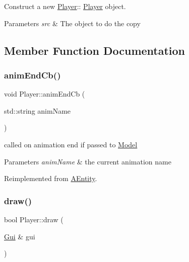Construct a new \hyperlink{class_player}{Player}\+:\+: \hyperlink{class_player}{Player} object. 


\begin{DoxyParams}{Parameters}
{\em src} & The object to do the copy \\
\hline
\end{DoxyParams}


\subsection{Member Function Documentation}
\mbox{\label{class_player_a26c511cf5a62d7de26347cdc15df609b}} 
\subsubsection{\texorpdfstring{anim\+End\+Cb()}{animEndCb()}}
{\footnotesize\ttfamily void Player\+::anim\+End\+Cb (\begin{DoxyParamCaption}\item[{std\+::string}]{anim\+Name }\end{DoxyParamCaption})\hspace{0.3cm}{\ttfamily [virtual]}}



called on animation end if passed to \hyperlink{class_model}{Model} 


\begin{DoxyParams}{Parameters}
{\em anim\+Name} & the current animation name \\
\hline
\end{DoxyParams}


Reimplemented from \hyperlink{class_a_entity_ac1fd0bdb4c01a4767660f03cd06cd2ac}{A\+Entity}.

\mbox{\label{class_player_a1194c157df144e864d0328d267dfa75c}} 
\subsubsection{\texorpdfstring{draw()}{draw()}}
{\footnotesize\ttfamily bool Player\+::draw (\begin{DoxyParamCaption}\item[{\hyperlink{class_gui}{Gui} \&}]{gui }\end{DoxyParamCaption})\hspace{0.3cm}{\ttfamily [virtual]}}



